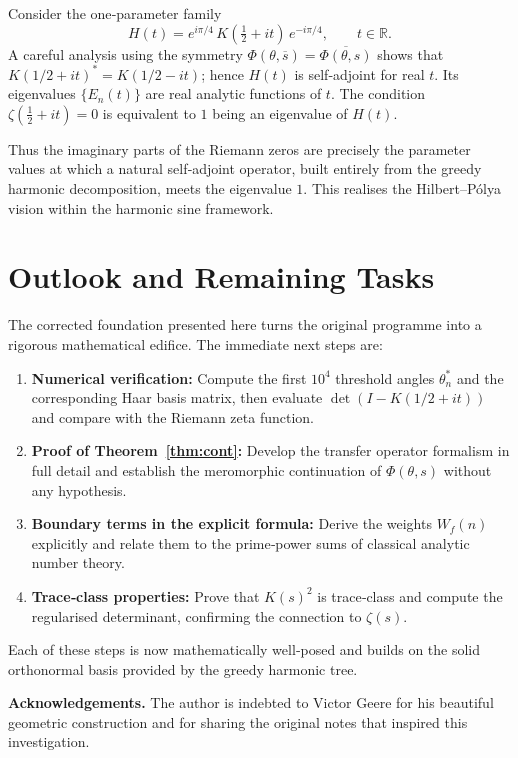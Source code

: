 \documentclass[11pt,a4paper]{article}
\theoremstyle{remark}
\begin{document}
Consider the one‑parameter family
\[
H(t) = e^{i\pi/4}\,K\!\left(\tfrac12+it\right)\,e^{-i\pi/4},\qquad t\in\mathbb{R}.
\]
A careful analysis using the symmetry \(\Phi(\theta,\overline{s}) = \overline{\Phi(\theta,s)}\) shows that \(K(1/2+it)^* = K(1/2-it)\); hence \(H(t)\) is self‑adjoint for real \(t\). Its eigenvalues \(\{E_n(t)\}\) are real analytic functions of \(t\). The condition \(\zeta(\tfrac12+it)=0\) is equivalent to \(1\) being an eigenvalue of \(H(t)\).

Thus the imaginary parts of the Riemann zeros are precisely the parameter values at which a natural self‑adjoint operator, built entirely from the greedy harmonic decomposition, meets the eigenvalue \(1\). This realises the Hilbert–Pólya vision within the harmonic sine framework.

\section{Outlook and Remaining Tasks}

The corrected foundation presented here turns the original programme into a rigorous mathematical edifice. The immediate next steps are:
\begin{enumerate}
    \item \textbf{Numerical verification:} Compute the first \(10^4\) threshold angles \(\theta_n^*\) and the corresponding Haar basis matrix, then evaluate \(\det(I-K(1/2+it))\) and compare with the Riemann zeta function.
    \item \textbf{Proof of Theorem~\ref{thm:cont}:} Develop the transfer operator formalism in full detail and establish the meromorphic continuation of \(\Phi(\theta,s)\) without any hypothesis.
    \item \textbf{Boundary terms in the explicit formula:} Derive the weights \(W_f(n)\) explicitly and relate them to the prime‑power sums of classical analytic number theory.
    \item \textbf{Trace‑class properties:} Prove that \(K(s)^2\) is trace‑class and compute the regularised determinant, confirming the connection to \(\zeta(s)\).
\end{enumerate}

Each of these steps is now mathematically well‑posed and builds on the solid orthonormal basis provided by the greedy harmonic tree.

\bigskip

{\bf Acknowledgements.} The author is indebted to Victor Geere for his beautiful geometric construction and for sharing the original notes that inspired this investigation.
\end{document}
